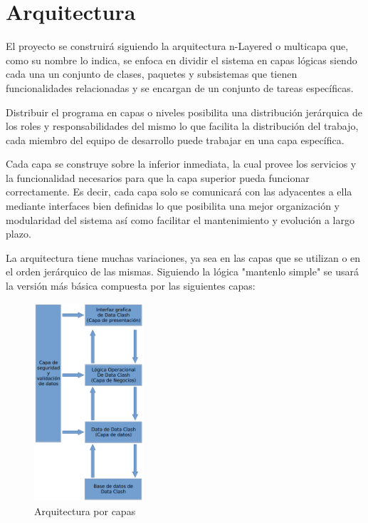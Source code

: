 %
%
%
%
\section{Arquitectura}

El proyecto se construirá siguiendo la arquitectura n-Layered o multicapa que, como su nombre lo indica, se enfoca en dividir el sistema en capas lógicas siendo cada una un conjunto de clases, paquetes y subsistemas que tienen funcionalidades relacionadas y se encargan de un conjunto de tareas específicas. 

Distribuir el programa en capas o niveles posibilita una distribución jerárquica de los roles y responsabilidades del mismo lo que facilita la distribución del trabajo, cada miembro del equipo de desarrollo puede trabajar en una capa específica.

Cada capa se construye sobre la inferior inmediata, la cual provee los servicios y la funcionalidad necesarios para que la capa superior pueda funcionar correctamente. Es decir, cada capa solo se comunicará con las adyacentes a ella mediante interfaces bien definidas lo que posibilita una mejor organización y modularidad del sistema así como facilitar el mantenimiento y evolución a largo plazo.

La arquitectura tiene muchas variaciones, ya sea en las capas que se utilizan o en el orden jerárquico de las mismas. Siguiendo la lógica "mantenlo simple" se usará la versión más básica compuesta por las siguientes capas:

\begin{figure}[H]
  \centering
  \includegraphics[width=0.36\textwidth]{../images/figure_architecture.png}
  \caption{Arquitectura por capas}
\end{figure}

